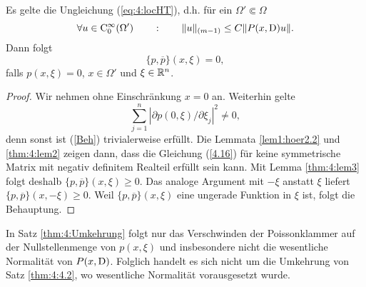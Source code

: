 \begin{thm}
\label{thm:4:Umkehrung}
Es gelte die Ungleichung (\ref{eq:4:locHT}), d.h. für ein $\Omega'\Subset\Omega$
\begin{equation}
  \forall u\in\mathrm C_0^\infty(\Omega') \qquad:\qquad  \| u\|_{(m-1)} \le C \| P(x,\mathrm D) u \|.
\end{equation}
Dann folgt 
\begin{equation}
	\label{Beh}
\{p,\overline p\} (x,\xi) = 0,
\end{equation}
falls $p(x,\xi) = 0$, $x \in \Omega'$ und $ \xi \in \mathbb R^n$.
\end{thm}
\begin{proof}
Wir nehmen ohne Einschränkung $x=0$ an. Weiterhin gelte
\begin{equation}
\sum_{j=1}^{n}|\partial p(0,\xi)/\partial \xi_j|^2 \neq 0,
\end{equation}
denn sonst ist (\ref{Beh}) trivialerweise erfüllt. Die Lemmata \ref{lem1:hoer2.2} und \ref{thm:4:lem2} zeigen dann, dass die Gleichung (\ref{4.16}) für keine symmetrische Matrix mit negativ definitem Realteil erfüllt sein kann. Mit Lemma \ref{thm:4:lem3} folgt deshalb $\{p,\overline p\}(x,\xi) \ge 0$. Das analoge Argument mit $-\xi$ anstatt $\xi$ liefert $\{p,\overline p\}(x,-\xi) \ge 0$. Weil $\{p,\overline p\}(x,\xi)$ eine ungerade Funktion in $\xi$ ist, folgt die Behauptung.
\end{proof}
\begin{rem}
In Satz \ref{thm:4:Umkehrung} folgt nur das Verschwinden der Poissonklammer auf der Nullstellenmenge von $p(x,\xi)$ und insbesondere nicht die wesentliche Normalität von $P(x,\mathrm D)$. Folglich handelt es sich nicht um die Umkehrung von Satz \ref{thm:4:4.2}, wo wesentliche Normalität vorausgesetzt wurde.
\end{rem}

